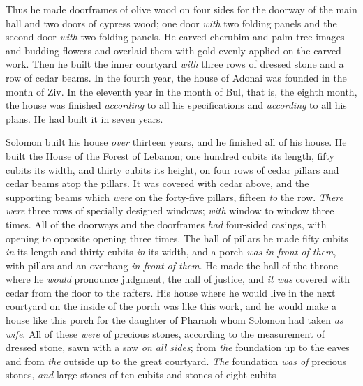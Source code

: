 \begin{biblechapter}
\verse Thus he made doorframes of olive wood on four sides for the doorway of the main hall
\verse and two doors of cypress wood; one door \textit{with} two folding panels and the second door \textit{with} two folding panels.
\verse He carved cherubim and palm tree images and budding flowers and overlaid them with gold evenly applied on the carved work.
\verse Then he built the inner courtyard \textit{with} three rows of dressed stone and a row of cedar beams.
\verse In the fourth year, the house of Adonai was founded in the month of Ziv.
\verse In the eleventh year in the month of Bul, that is, the eighth month, the house was finished \textit{according} to all his specifications and \textit{according} to all his plans. He had built it in seven years.
\end{biblechapter}

\begin{biblechapter} %
 Solomon built his house \textit{over} thirteen years, and he finished all of his house.
\verse He built the House of the Forest of Lebanon; one hundred cubits its length, fifty cubits its width, and thirty cubits its height, on four rows of cedar pillars and cedar beams atop the pillars.
\verse It was covered with cedar above, and the supporting beams which \textit{were} on the forty-five pillars, fifteen \textit{to} the row.
\verse \textit{There were} three rows of specially designed windows; \textit{with} window to window three times.
\verse All of the doorways and the doorframes \textit{had} four-sided casings, with opening to opposite opening three times.
\verse The hall of pillars he made fifty cubits \textit{in} its length and thirty cubits \textit{in} its width, and a porch \textit{was} \textit{in front of them}, with pillars and an overhang \textit{in front of them}.
\verse He made the hall of the throne where he \textit{would} pronounce judgment, the hall of justice, and \textit{it was} covered with cedar from the floor to the rafters.
\verse His house where he would live in the next courtyard on the inside of the porch was like this work, and he would make a house like this porch for the daughter of Pharaoh whom Solomon had taken \textit{as wife}.
\verse All of these \textit{were} of precious stones, according to the measurement of dressed stone, sawn with a saw \textit{on all sides}; from \textit{the} foundation up to the eaves and from \textit{the} outside up to the great courtyard.
\verse \textit{The} foundation \textit{was of} precious stones, \textit{and} large stones of ten cubits and stones of eight cubits

\end{biblechapter}
